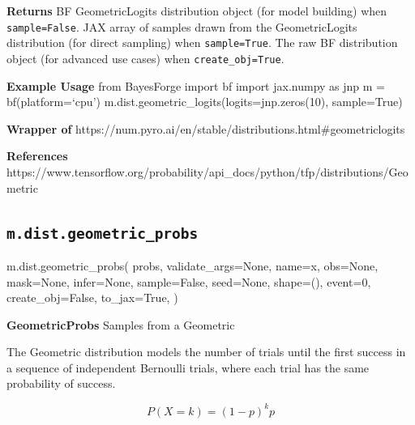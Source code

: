 \documentclass[
  letterpaper,
  DIV=11,
  numbers=noendperiod]{scrartcl}
\newenvironment{Shaded}{\begin{snugshade}}{\end{snugshade}}
\newcommand{\DecValTok}[1]{\textcolor[rgb]{0.68,0.00,0.00}{#1}}
\newcommand{\NormalTok}[1]{\textcolor[rgb]{0.00,0.23,0.31}{#1}}
\newcommand{\OperatorTok}[1]{\textcolor[rgb]{0.37,0.37,0.37}{#1}}
\newcommand{\StringTok}[1]{\textcolor[rgb]{0.13,0.47,0.30}{#1}}
\newcommand{\VariableTok}[1]{\textcolor[rgb]{0.07,0.07,0.07}{#1}}
\begin{document}
\textbf{Returns} BF GeometricLogits distribution object (for model
building) when \texttt{sample=False}. JAX array of samples drawn from
the GeometricLogits distribution (for direct sampling) when
\texttt{sample=True}. The raw BF distribution object (for advanced use
cases) when \texttt{create\_obj=True}.

\textbf{Example Usage} from BayesForge import bf import jax.numpy as jnp
m = bf(platform=`cpu') m.dist.geometric\_logits(logits=jnp.zeros(10),
sample=True)

\textbf{Wrapper of}
https://num.pyro.ai/en/stable/distributions.html\#geometriclogits

\textbf{References}
https://www.tensorflow.org/probability/api\_docs/python/tfp/distributions/Geometric

\subsection{\texorpdfstring{\texttt{m.dist.geometric\_probs}}{m.dist.geometric\_probs}}\label{geometric_probs}

\begin{Shaded}
\begin{Highlighting}[]
\NormalTok{m.dist.geometric\_probs(}
\NormalTok{    probs,}
\NormalTok{    validate\_args}\OperatorTok{=}\VariableTok{None}\NormalTok{,}
\NormalTok{    name}\OperatorTok{=}\StringTok{\textquotesingle{}x\textquotesingle{}}\NormalTok{,}
\NormalTok{    obs}\OperatorTok{=}\VariableTok{None}\NormalTok{,}
\NormalTok{    mask}\OperatorTok{=}\VariableTok{None}\NormalTok{,}
\NormalTok{    infer}\OperatorTok{=}\VariableTok{None}\NormalTok{,}
\NormalTok{    sample}\OperatorTok{=}\VariableTok{False}\NormalTok{,}
\NormalTok{    seed}\OperatorTok{=}\VariableTok{None}\NormalTok{,}
\NormalTok{    shape}\OperatorTok{=}\NormalTok{(),}
\NormalTok{    event}\OperatorTok{=}\DecValTok{0}\NormalTok{,}
\NormalTok{    create\_obj}\OperatorTok{=}\VariableTok{False}\NormalTok{,}
\NormalTok{    to\_jax}\OperatorTok{=}\VariableTok{True}\NormalTok{,}
\NormalTok{)}
\end{Highlighting}
\end{Shaded}

\textbf{GeometricProbs} Samples from a Geometric

The Geometric distribution models the number of trials until the first
success in a sequence of independent Bernoulli trials, where each trial
has the same probability of success.

\[
   P(X = k) = (1 - p)^k p
\]
\end{document}
